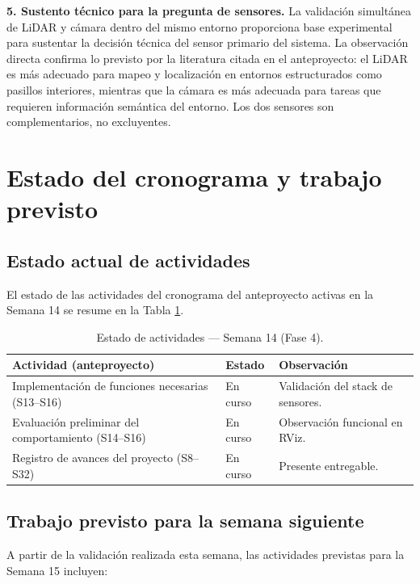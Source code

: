 \documentclass[12pt,letterpaper]{article}
\begin{document}
\textbf{5. Sustento técnico para la pregunta de sensores.} La validación simultánea de LiDAR y cámara dentro del mismo entorno proporciona base experimental para sustentar la decisión técnica del sensor primario del sistema. La observación directa confirma lo previsto por la literatura citada en el anteproyecto: el LiDAR es más adecuado para mapeo y localización en entornos estructurados como pasillos interiores, mientras que la cámara es más adecuada para tareas que requieren información semántica del entorno. Los dos sensores son complementarios, no excluyentes.

\section{Estado del cronograma y trabajo previsto}

\subsection{Estado actual de actividades}

El estado de las actividades del cronograma del anteproyecto activas en la Semana 14 se resume en la Tabla \ref{tab:estado_s14}.

\begin{table}[!ht]
    \centering
    \caption{Estado de actividades --- Semana 14 (Fase 4).}
    \label{tab:estado_s14}
    \begin{tabular}{@{}lll@{}}
        \toprule
        \textbf{Actividad (anteproyecto)} & \textbf{Estado} & \textbf{Observación} \\ \midrule
        Implementación de funciones necesarias (S13--S16) & En curso & Validación del stack de sensores. \\
        Evaluación preliminar del comportamiento (S14--S16) & En curso & Observación funcional en RViz. \\
        Registro de avances del proyecto (S8--S32) & En curso & Presente entregable. \\ \bottomrule
    \end{tabular}
\end{table}

\subsection{Trabajo previsto para la semana siguiente}

A partir de la validación realizada esta semana, las actividades previstas para la Semana 15 incluyen:
\end{document}
